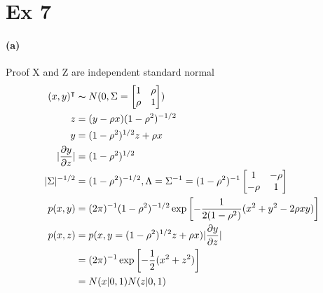 \documentclass[11pt, letterpaper]{article}
\begin{document}
\section{Ex 7}
\paragraph{(a)} Proof X and Z are independent standard normal
\begin{align*}
    (x, y)^{\intercal} &\thicksim N(0, \Sigma=\begin{bmatrix}1 & \rho \\ \rho & 1\end{bmatrix}) \\
    z &= (y - \rho x) (1-\rho^2)^{-1/2} \\
    y &= (1-\rho^2)^{1/2} z + \rho x \\
    |\frac{\partial y}{\partial z}| &= (1-\rho^2)^{1/2} \\
    |\Sigma|^{-1/2} &= (1-\rho^2)^{-1/2}, \Lambda = \Sigma^{-1} = (1-\rho^2)^{-1} \begin{bmatrix}1 & -\rho \\ -\rho & 1\end{bmatrix} \\
    p(x,y) &= (2\pi)^{-1}(1-\rho^2)^{-1/2} \exp\left[ -\frac{1}{2(1-\rho^2)}(x^2+y^2-2\rho x y) \right] \\
    p(x,z) &= p(x, y=(1-\rho^2)^{1/2} z + \rho x) |\frac{\partial y}{\partial z}| \\
        &= (2\pi)^{-1} \exp\left[-\frac{1}{2}(x^2 + z^2) \right] \\
        &= N(x|0, 1) N(z|0, 1)
\end{align*}
\end{document}
